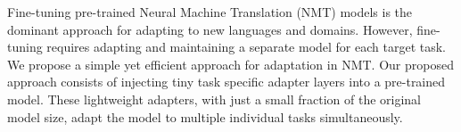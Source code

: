Fine-tuning pre-trained Neural Machine Translation (NMT) models is the dominant approach for adapting to new languages and domains. However, fine-tuning requires adapting and maintaining a separate model for each target task. We propose a simple yet efficient approach for adaptation in NMT. Our proposed approach consists of injecting tiny task specific adapter layers into a pre-trained model. These lightweight adapters, with just a small fraction of the original model size, adapt the model to multiple individual tasks simultaneously.